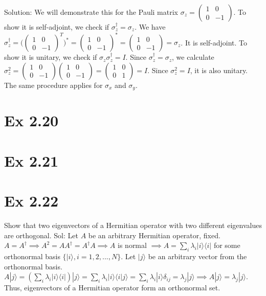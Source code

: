 \documentclass{article}
\newcommand{\0}{{$|0\rangle$}}
\newcommand{\1}{{$|1\rangle$}}
\begin{document}
Solution: We will demonstrate this for the Pauli matrix $ \sigma_z = \begin{pmatrix} 1 & 0 \\ 0 & -1 \end{pmatrix} $. To show it is self-adjoint, we check if $ \sigma_z^\dagger = \sigma_z $. We have  
$ \sigma_z^\dagger = \big(\begin{pmatrix} 1 & 0 \\ 0 & -1 \end{pmatrix}^T\big)^* = \begin{pmatrix} 1 & 0 \\ 0 & -1 \end{pmatrix}^* = \begin{pmatrix} 1 & 0 \\ 0 & -1 \end{pmatrix} = \sigma_z $. It is self-adjoint. To show it is unitary, we check if $ \sigma_z \sigma_z^\dagger = I $. Since $ \sigma_z^\dagger = \sigma_z $, we calculate  
$ \sigma_z^2 = \begin{pmatrix} 1 & 0 \\ 0 & -1 \end{pmatrix} \begin{pmatrix} 1 & 0 \\ 0 & -1 \end{pmatrix} = \begin{pmatrix} 1 & 0 \\ 0 & 1 \end{pmatrix} = I $. Since $ \sigma_z^2=I $, it is also unitary. The same procedure applies for $ \sigma_x $ and $ \sigma_y $.

\newpage
\section*{Ex 2.20 } 

\newpage
\section*{Ex 2.21 } 

\newpage
\section*{Ex 2.22 } 
Show that two eigenvectors of a Hermitian operator with two different eigenvalues are orthogonal.  
Sol: Let $A$ be an arbitrary Hermitian operator, fixed. $A=A^{\dagger} \implies A^{2}=A A^{\dagger}=A^{\dagger} A \implies A$ is normal $\implies A=\sum_{i} \lambda_i |i\rangle\langle i|$ for some orthonormal basis $\{|i\rangle, i=1,2,...,N\}$. Let $|j\rangle$ be an arbitrary vector from the orthonormal basis.  
$A|j\rangle=(\sum_i \lambda_i |i\rangle\langle i|)|j\rangle = \sum_i \lambda_i |i\rangle\langle i|j\rangle = \sum_i \lambda_i |i\rangle \delta_{ij} = \lambda_j |j\rangle \implies A|j\rangle = \lambda_j |j\rangle$. Thus, eigenvectors of a Hermitian operator form an orthonormal set.
\end{document}
